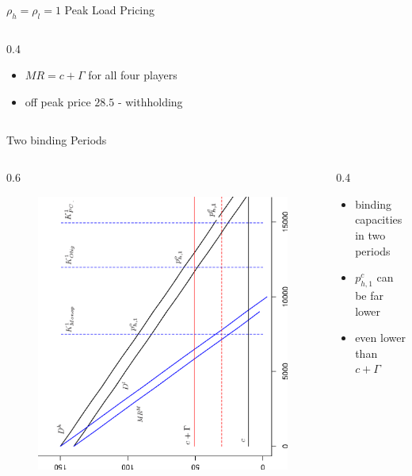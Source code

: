 \begin{frame} {$\rho_h = \rho_l = 1$ Peak Load Pricing}
\begin{columns}
\begin{column} {0.4\textwidth}
\begin{itemize}
\begin{itemize}
	 \item $MR = c+ \Gamma$ for all four players
	 \item off peak price $28.5$ - withholding
\end{itemize}
\end{itemize}
\end{column}
\end{columns}

\end{frame}


\begin{frame} {Two binding Periods}					
\begin{columns}
\begin{column} {0.6\textwidth}
\begin{figure}[h]
\centering
\includegraphics[width=1.0\textwidth,angle=270]{22}
    \label{fig:1}            
\end{figure}
\end{column}

\begin{column} {0.4\textwidth}

\begin{itemize}
	\item binding capacities in two periods
	\item $p^c_{h,1}$ can be far lower
	\item even lower than $c+\Gamma$
\end{itemize}

\end{column}
\end{columns}

\end{frame}

